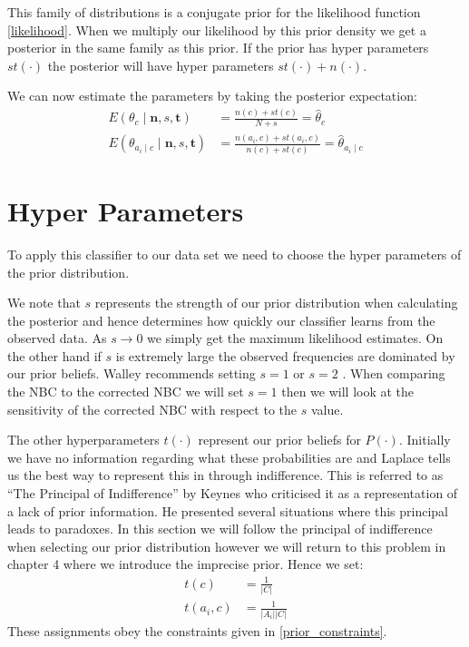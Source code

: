 This family of distributions is a conjugate prior for the likelihood function \cref{likelihood}.
When we multiply our likelihood by this prior density we get a posterior in the same family as this prior.
If the prior has hyper parameters $st(\cdot)$ the posterior will have hyper parameters $st(\cdot) + n(\cdot)$.

We can now estimate the parameters by taking the posterior expectation:
\begin{align}
	E(\theta_c \mid \mathbf{n},s,\mathbf{t}) & = \frac{n(c) + st(c)}{N + s} = \hat{\theta}_c \\
	E(\theta_{a_i \mid c} \mid \mathbf{n},s,\mathbf{t}) & = \frac{n(a_i, c) + st(a_i, c)}{n(c) + st(c)} = \hat{\theta}_{a_i \mid c}
\end{align}

\section{Hyper Parameters}

To apply this classifier to our data set we need to choose the hyper parameters of the prior distribution.

We note that $s$ represents the strength of our prior distribution when calculating the posterior and hence determines how quickly our classifier learns from the observed data.
As $s \rightarrow 0$ we simply get the maximum likelihood estimates.
On the other hand if $s$ is extremely large the observed frequencies are dominated by our prior beliefs.
Walley recommends setting $s=1$ or $s=2$ \cite{Walley96}.
When comparing the NBC to the corrected NBC we will set $s=1$ then we will look at the sensitivity of the corrected NBC with respect to the $s$ value.

The other hyperparameters $t(\cdot)$ represent our prior beliefs for $P(\cdot)$.
Initially we have no information regarding what these probabilities are and Laplace tells us \cite{laplace1812} the best way to represent this in through indifference.
This is referred to as ``The Principal of Indifference'' by Keynes \cite{Keynes21} who criticised it as a representation of a lack of prior information.
He presented several situations where this principal leads to paradoxes.
In this section we will follow the principal of indifference when selecting our prior distribution however we will return to this problem in chapter 4 where we introduce the imprecise prior.
Hence we set:
\begin{align}\label{initial prior}
	t(c)      & = \frac{1}{|C|} \\
	t(a_i, c) & = \frac{1}{|A_i||C|}
\end{align}
These assignments obey the constraints given in \cref{prior_constraints}.


